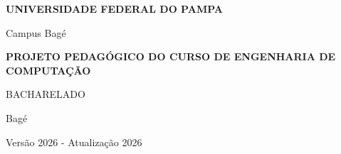 \begin{center}
    \thispagestyle{estilocapa} %
    
    \begin{center}
        \vspace*{2cm}
        {\large \textbf{UNIVERSIDADE FEDERAL DO PAMPA}}\par
        {\large Campus Bagé}\par
        
        \vspace{4cm}
        
        {\Large \textbf{PROJETO PEDAGÓGICO DO CURSO DE ENGENHARIA DE COMPUTAÇÃO}}\par
        \vspace{1cm}
        {\large BACHARELADO}\par
        
        \vfill
        
        {\large Bagé}\par
        {\large Versão 2026 - Atualização 2026}\par
    \end{center}
\end{center}

\newpage


\newpage
\thispagestyle{empty} %


